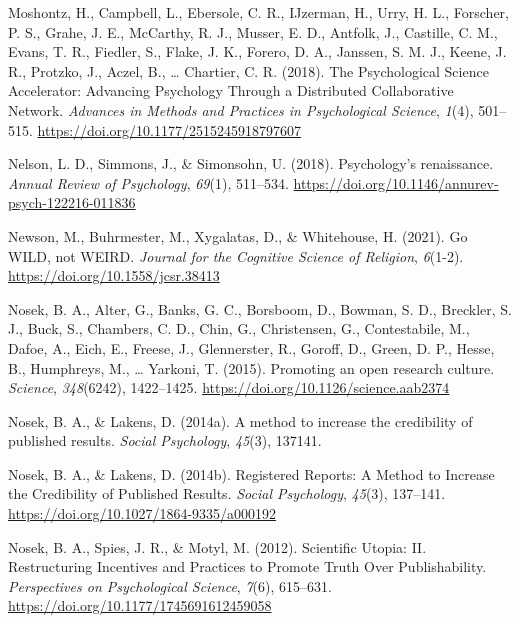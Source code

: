 \documentclass[
  man]{apa7}
\newlength{\cslhangindent}
\newlength{\cslentryspacingunit} %
\newenvironment{CSLReferences}[2] %
 {%
  \setlength{\parindent}{0pt}
  \ifodd #1
  \let\oldpar\par
  \def\par{\hangindent=\cslhangindent\oldpar}
  \fi
  \setlength{\parskip}{#2\cslentryspacingunit}
 }%
 {}
\begin{document}
\begin{CSLReferences}{1}{0}
\leavevmode{}%
Moshontz, H., Campbell, L., Ebersole, C. R., IJzerman, H., Urry, H. L., Forscher, P. S., Grahe, J. E., McCarthy, R. J., Musser, E. D., Antfolk, J., Castille, C. M., Evans, T. R., Fiedler, S., Flake, J. K., Forero, D. A., Janssen, S. M. J., Keene, J. R., Protzko, J., Aczel, B., \ldots{} Chartier, C. R. (2018). The Psychological Science Accelerator: Advancing Psychology Through a Distributed Collaborative Network. \emph{Advances in Methods and Practices in Psychological Science}, \emph{1}(4), 501--515. \url{https://doi.org/10.1177/2515245918797607}

\leavevmode{}%
Nelson, L. D., Simmons, J., \& Simonsohn, U. (2018). Psychology's renaissance. \emph{Annual Review of Psychology}, \emph{69}(1), 511--534. \url{https://doi.org/10.1146/annurev-psych-122216-011836}

\leavevmode{}%
Newson, M., Buhrmester, M., Xygalatas, D., \& Whitehouse, H. (2021). Go WILD, not WEIRD. \emph{Journal for the Cognitive Science of Religion}, \emph{6}(1-2). \url{https://doi.org/10.1558/jcsr.38413}

\leavevmode{}%
Nosek, B. A., Alter, G., Banks, G. C., Borsboom, D., Bowman, S. D., Breckler, S. J., Buck, S., Chambers, C. D., Chin, G., Christensen, G., Contestabile, M., Dafoe, A., Eich, E., Freese, J., Glennerster, R., Goroff, D., Green, D. P., Hesse, B., Humphreys, M., \ldots{} Yarkoni, T. (2015). Promoting an open research culture. \emph{Science}, \emph{348}(6242), 1422--1425. \url{https://doi.org/10.1126/science.aab2374}

\leavevmode{}%
Nosek, B. A., \& Lakens, D. (2014a). A method to increase the credibility of published results. \emph{Social Psychology}, \emph{45}(3), 137141.

\leavevmode{}%
Nosek, B. A., \& Lakens, D. (2014b). Registered Reports: A Method to Increase the Credibility of Published Results. \emph{Social Psychology}, \emph{45}(3), 137--141. \url{https://doi.org/10.1027/1864-9335/a000192}

\leavevmode{}%
Nosek, B. A., Spies, J. R., \& Motyl, M. (2012). Scientific Utopia: II. Restructuring Incentives and Practices to Promote Truth Over Publishability. \emph{Perspectives on Psychological Science}, \emph{7}(6), 615--631. \url{https://doi.org/10.1177/1745691612459058}


\end{CSLReferences}
\end{document}
